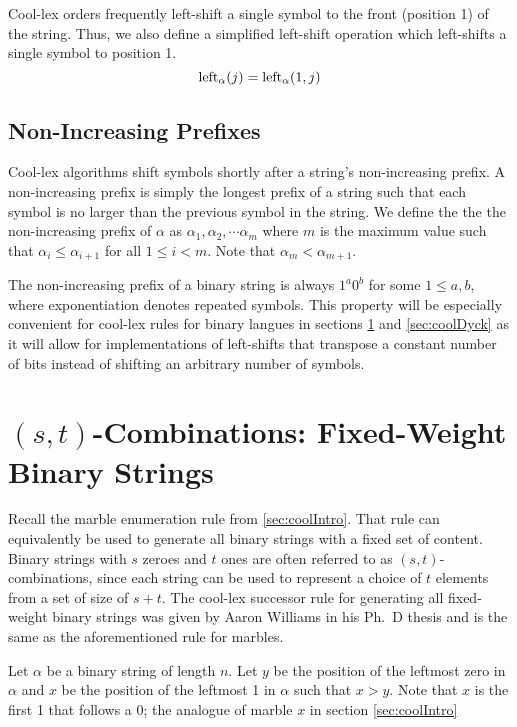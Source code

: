 Cool-lex orders frequently left-shift a single symbol to the front (position 1) of the string.  Thus, we also define a simplified left-shift operation which left-shifts a single symbol to position 1.  
\begin{equation} \label{eq:simplelshiftdef}
\leftshift[\alpha]{j}=\lshiftindex[\alpha]{1}{j}
\end{equation}



\subsection{Non-Increasing Prefixes}
Cool-lex algorithms  shift symbols shortly after a string's non-increasing prefix.  A non-increasing prefix is simply the longest prefix of a string such that each symbol is no larger than the previous symbol in the string.  We define the the the non-increasing prefix of $\alpha$ as $\alpha_1,\alpha_2,\cdots\alpha_m$ where $m$ is 
the maximum value such that $\alpha_{i} \le \alpha_{i+1}$ for all $1 \le i < m$. Note that $\alpha_m < \alpha_{m+1}$. 

The non-increasing prefix of a binary string is always $1^a0^b$ for some $1 \le a,b$, where exponentiation denotes repeated symbols.  This property will be especially convenient for cool-lex rules for binary langues in sections \ref{sec:coolCombo} and \ref{sec:coolDyck} as it will allow for implementations of left-shifts that transpose a constant number of bits instead of shifting an arbitrary number of symbols.

\section{$(s,t)$-Combinations: Fixed-Weight Binary Strings} \label{sec:coolCombo}
Recall the marble enumeration rule from \ref{sec:coolIntro}.  That rule can equivalently be used to generate all binary strings with a fixed set of content.  
Binary strings with $s$ zeroes and $t$ ones are often referred to as $(s,t)$-combinations, since each string can be used to represent a choice of $t$ elements from a set of size of $s+t$.  The cool-lex successor rule for generating all fixed-weight binary strings was given by Aaron Williams in his Ph.\ D thesis \cite{williams2009shift} and is the same as the aforementioned rule for marbles.

 Let $\alpha$ be a binary string of length $n$.
 Let $y$ be the position of the leftmost zero in $\alpha$ and $x$ be the position of the leftmost 1 in $\alpha$ such that $x > y$. Note that $x$ is the first 1 that follows a 0; the analogue of marble $x$ in section \ref{sec:coolIntro}

